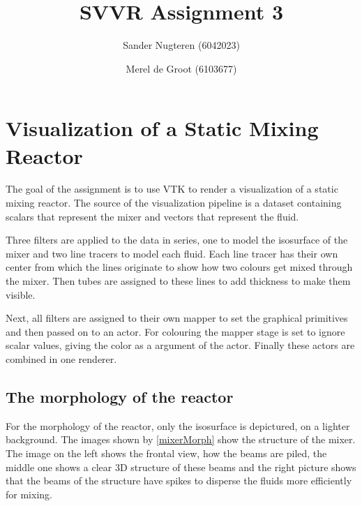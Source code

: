 \documentclass{article}
\begin{document}
\title{SVVR Assignment 3}
\author{Sander Nugteren (6042023) \and Merel de Groot (6103677)}
\renewcommand{\today}{November 24, 2014}
\maketitle


\section*{Visualization of a Static Mixing Reactor}
The goal of the assignment is to use VTK to render a visualization of a static mixing reactor. The source of the visualization pipeline is a dataset containing scalars that represent the mixer and vectors that represent the fluid. 

Three filters are applied to the data in series, one to model the isosurface of the mixer and two line tracers to model each fluid. Each line tracer has their own center from which the lines originate to show how two colours get mixed through the mixer. Then tubes are assigned to these lines to add thickness to make them visible.  

Next, all filters are assigned to their own mapper to set the graphical primitives and then passed on to an actor. For colouring the mapper stage is set to ignore scalar values, giving the color as a argument of the actor. Finally these actors are combined in one renderer. 

\subsection*{The morphology of the reactor}
For the morphology of the reactor, only the isosurface is depictured, on a lighter background. The images shown by \ref{mixerMorph} show the structure of the mixer. The image on the left shows the frontal view, how the beams are piled, the middle one shows a clear 3D structure of these beams and the right picture shows that the beams of the structure have spikes to disperse the fluids more efficiently for mixing.
\end{document}
